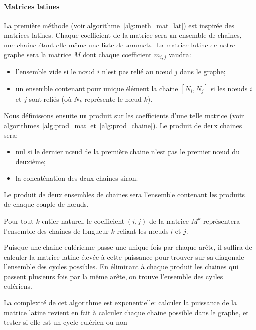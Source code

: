     \paragraph{Matrices latines}
      La première méthode (voir algorithme~\ref{alg:meth_mat_lat}) est inspirée
      des matrices latines. Chaque coefficient de la matrice sera un ensemble
      de chaines, une chaine étant elle-même une liste de sommets. La matrice
      latine de notre graphe sera la matrice $M$ dont chaque coefficient
      $m_{i,j}$ vaudra:
      \begin{itemize}
        \item l'ensemble vide si le nœud $i$ n'est pas relié au nœud $j$ dans
          le graphe;
        \item un ensemble contenant pour unique élément la chaine  $[N_i,N_j]$
          si les nœuds $i$ et $j$ sont reliés (où $N_k$ représente le nœud
          $k$).
      \end{itemize}

      Nous définissons ensuite un produit sur les coefficients d'une telle
      matrice (voir algorithmes~\ref{alg:prod_mat} et~\ref{alg:prod_chaine}). Le
      produit de deux chaines sera:
      \begin{itemize}
        \item nul si le dernier nœud de la première chaine n'est pas le premier
          nœud du deuxième;
        \item la concaténation des deux chaines sinon.
      \end{itemize}

      Le produit de deux ensembles de chaines sera l'ensemble contenant les
      produits de chaque couple de nœuds.

      Pour tout $k$ entier naturel, le coefficient $(i,j)$ de la matrice $M^k$
      représentera l'ensemble des chaines de longueur $k$ reliant les nœuds $i$
      et $j$.

      Puisque une chaine eulérienne passe une unique fois par chaque arête, il
      suffira de calculer la matrice latine élevée à cette puissance pour
      trouver sur sa diagonale l'ensemble des cycles possibles. En éliminant à
      chaque produit les chaines qui passent plusieurs fois par la même arête,
      on trouve l'ensemble des cycles eulériens.

      La complexité de cet algorithme est exponentielle: calculer la puissance
      de la matrice latine revient en fait à calculer chaque chaine possible dans
      le graphe, et tester si elle est un cycle eulérien ou non.

